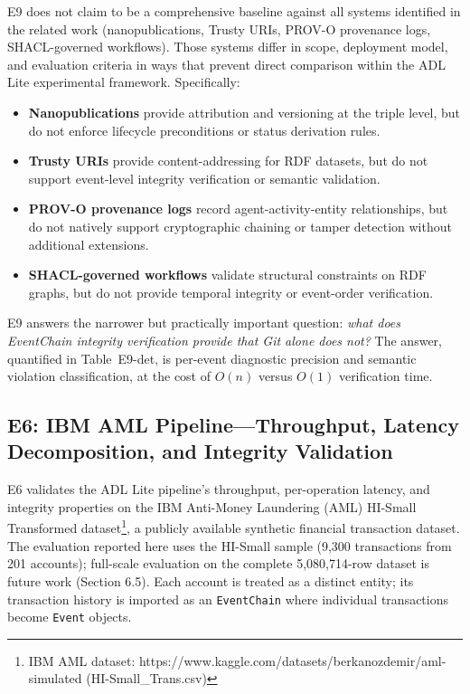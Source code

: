 E9 does not claim to be a comprehensive baseline against all systems identified in the related work (nanopublications, Trusty URIs, PROV-O provenance logs, SHACL-governed workflows). Those systems differ in scope, deployment model, and evaluation criteria in ways that prevent direct comparison within the ADL Lite experimental framework. Specifically:

\begin{itemize}
\tightlist
\item
  \textbf{Nanopublications} provide attribution and versioning at the triple level, but do not enforce lifecycle preconditions or status derivation rules.
\item
  \textbf{Trusty URIs} provide content-addressing for RDF datasets, but do not support event-level integrity verification or semantic validation.
\item
  \textbf{PROV-O provenance logs} record agent-activity-entity relationships, but do not natively support cryptographic chaining or tamper detection without additional extensions.
\item
  \textbf{SHACL-governed workflows} validate structural constraints on RDF graphs, but do not provide temporal integrity or event-order verification.
\end{itemize}

E9 answers the narrower but practically important question: \emph{what does EventChain integrity verification provide that Git alone does not?} The answer, quantified in Table~E9-det, is per-event diagnostic precision and semantic violation classification, at the cost of \(O(n)\) versus \(O(1)\) verification time.

\subsection{E6: IBM AML Pipeline---Throughput, Latency Decomposition, and Integrity Validation}\label{e6-ibm-aml-pipelinethroughput-latency-decomposition-and-integrity-validation}

E6 validates the ADL Lite pipeline's throughput, per-operation latency, and integrity properties on the IBM Anti-Money Laundering (AML) HI-Small Transformed dataset\footnote{IBM AML dataset: https://www.kaggle.com/datasets/berkanozdemir/aml-simulated (HI-Small\_Trans.csv)}, a publicly available synthetic financial transaction dataset. The evaluation reported here uses the HI-Small sample (9,300 transactions from 201 accounts); full-scale evaluation on the complete 5,080,714-row dataset is future work (Section 6.5). Each account is treated as a distinct entity; its transaction history is imported as an \texttt{EventChain} where individual transactions become \texttt{Event} objects.

